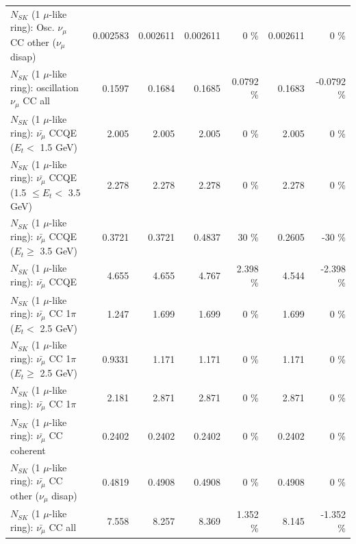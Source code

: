 \begin{table}
\begin{tabular}{| l | r | r | r  r | r  r |}
         $N_{SK}$ (1 $\mu$-like ring): Osc. $\nu_\mu$ CC other ($\nu_\mu$ disap) &        0.002583 &        0.002611 &        0.002611 &        0 \%  &        0.002611 &        0 \%  \\ 
                      $N_{SK}$ (1 $\mu$-like ring): oscillation $\nu_\mu$ CC all &          0.1597 &          0.1684 &          0.1685 &   0.0792 \%  &          0.1683 &  -0.0792 \%  \\ 
\hline
\hline
          $N_{SK}$ (1 $\mu$-like ring): $\bar{\nu_\mu}$ CCQE ($E_{t} <$ 1.5 GeV) &           2.005 &           2.005 &           2.005 &        0 \%  &           2.005 &        0 \%  \\ 
 $N_{SK}$ (1 $\mu$-like ring): $\bar{\nu_\mu}$ CCQE (1.5 $\leq E_{t} <$ 3.5 GeV) &           2.278 &           2.278 &           2.278 &        0 \%  &           2.278 &        0 \%  \\ 
       $N_{SK}$ (1 $\mu$-like ring): $\bar{\nu_\mu}$ CCQE ($E_{t} \geq$ 3.5 GeV) &          0.3721 &          0.3721 &          0.4837 &       30 \%  &          0.2605 &      -30 \%  \\ 
\hline
                              $N_{SK}$ (1 $\mu$-like ring): $\bar{\nu_\mu}$ CCQE &           4.655 &           4.655 &           4.767 &    2.398 \%  &           4.544 &   -2.398 \%  \\ 
\hline
     $N_{SK}$ (1 $\mu$-like ring): $\bar{\nu_\mu}$ CC 1$\pi$ ($E_{t} <$ 2.5 GeV) &           1.247 &           1.699 &           1.699 &        0 \%  &           1.699 &        0 \%  \\ 
  $N_{SK}$ (1 $\mu$-like ring): $\bar{\nu_\mu}$ CC 1$\pi$ ($E_{t} \geq$ 2.5 GeV) &          0.9331 &           1.171 &           1.171 &        0 \%  &           1.171 &        0 \%  \\ 
\hline
                         $N_{SK}$ (1 $\mu$-like ring): $\bar{\nu_\mu}$ CC 1$\pi$ &           2.181 &           2.871 &           2.871 &        0 \%  &           2.871 &        0 \%  \\ 
                       $N_{SK}$ (1 $\mu$-like ring): $\bar{\nu_\mu}$ CC coherent &          0.2402 &          0.2402 &          0.2402 &        0 \%  &          0.2402 &        0 \%  \\ 
        $N_{SK}$ (1 $\mu$-like ring): $\bar{\nu_\mu}$ CC other ($\nu_\mu$ disap) &          0.4819 &          0.4908 &          0.4908 &        0 \%  &          0.4908 &        0 \%  \\ 
                          $N_{SK}$ (1 $\mu$-like ring): $\bar{\nu_{\mu}}$ CC all &           7.558 &           8.257 &           8.369 &    1.352 \%  &           8.145 &   -1.352 \%  \\ 

\end{tabular}
\end{table}
